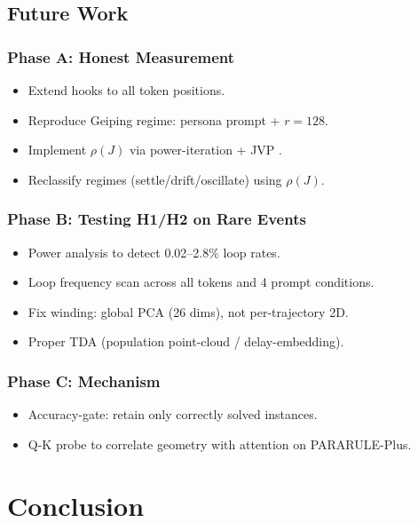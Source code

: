 \documentclass[12pt,a4paper]{article}
\begin{document}
\subsection{Future Work}

\subsubsection{Phase A: Honest Measurement}
\begin{itemize}
    \item Extend hooks to all token positions.
    \item Reproduce Geiping regime: persona prompt + $r=128$.
    \item Implement $\rho(J)$ via power-iteration + JVP \cite{yang2025stabilizing}.
    \item Reclassify regimes (settle/drift/oscillate) using $\rho(J)$.
\end{itemize}

\subsubsection{Phase B: Testing H1/H2 on Rare Events}
\begin{itemize}
    \item Power analysis to detect 0.02--2.8\% loop rates.
    \item Loop frequency scan across all tokens and 4 prompt conditions.
    \item Fix winding: global PCA (26 dims), not per-trajectory 2D.
    \item Proper TDA (population point-cloud / delay-embedding).
\end{itemize}

\subsubsection{Phase C: Mechanism}
\begin{itemize}
    \item Accuracy-gate: retain only correctly solved instances.
    \item Q-K probe \cite{tulchinskii2025quantifying} to correlate geometry with attention on PARARULE-Plus.
\end{itemize}

\section{Conclusion}
\end{document}
